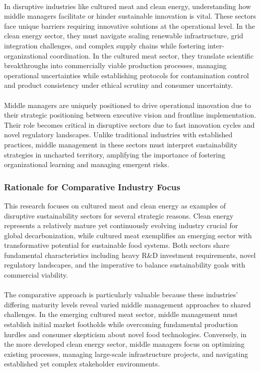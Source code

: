 	\paragraph*{} In disruptive industries like cultured meat and clean energy, understanding how middle managers facilitate or hinder sustainable innovation is vital. These sectors face unique barriers requiring innovative solutions at the operational level. In the clean energy sector, they must navigate scaling renewable infrastructure, grid integration challenges, and complex supply chains while fostering inter-organizational coordination. In the cultured meat sector, they translate scientific breakthroughs into commercially viable production processes, managing operational uncertainties while establishing protocols for contamination control and product consistency under ethical scrutiny and consumer uncertainty.
	
	\paragraph*{} Middle managers are uniquely positioned to drive operational innovation due to their strategic positioning between executive vision and frontline implementation. Their role becomes critical in disruptive sectors due to fast innovation cycles and novel regulatory landscapes. Unlike traditional industries with established practices, middle management in these sectors must interpret sustainability strategies in uncharted territory, amplifying the importance of fostering organizational learning and managing emergent risks.
	
	\subsubsection{Rationale for Comparative Industry Focus}
	This research focuses on cultured meat and clean energy as examples of disruptive sustainability sectors for several strategic reasons. Clean energy represents a relatively mature yet continuously evolving industry crucial for global decarbonization, while cultured meat exemplifies an emerging sector with transformative potential for sustainable food systems. Both sectors share fundamental characteristics including heavy R\&D investment requirements, novel regulatory landscapes, and the imperative to balance sustainability goals with commercial viability.
	
	\paragraph*{} The comparative approach is particularly valuable because these industries' differing maturity levels reveal varied middle management approaches to shared challenges. In the emerging cultured meat sector, middle management must establish initial market footholds while overcoming fundamental production hurdles and consumer skepticism about novel food technologies. Conversely, in the more developed clean energy sector, middle managers focus on optimizing existing processes, managing large-scale infrastructure projects, and navigating established yet complex stakeholder environments.
	
